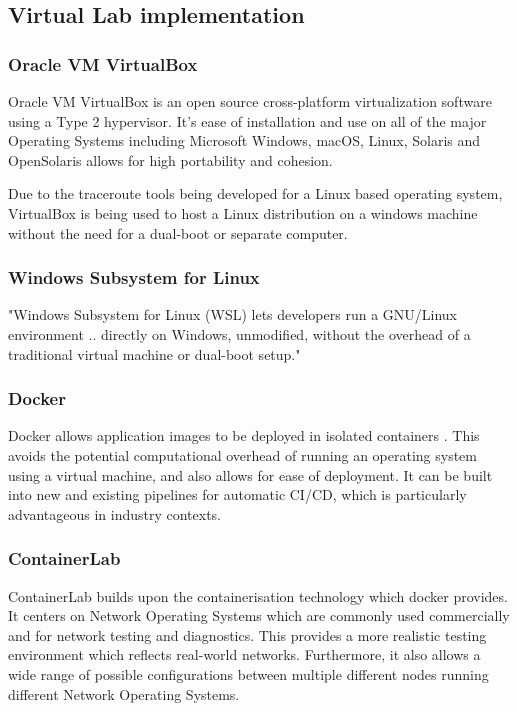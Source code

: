 \subsection{Virtual Lab implementation}

\subsubsection{Oracle VM VirtualBox}
Oracle VM VirtualBox is an open source cross-platform virtualization software using a Type 2 hypervisor. \cite{VirtualWare} It's ease of installation and use on all of the major Operating Systems including Microsoft Windows, macOS, Linux, Solaris and OpenSolaris \cite{oracleVM} allows for high portability and cohesion. 

Due to the traceroute tools being developed for a Linux based operating system, VirtualBox is being used to host a Linux distribution on a windows machine without the need for a dual-boot or separate computer.

\subsubsection{Windows Subsystem for Linux}
"Windows Subsystem for Linux (WSL) lets developers run a GNU/Linux environment .. directly on Windows, unmodified, without the overhead of a traditional virtual machine or dual-boot setup." \cite{wsl}

\subsubsection{Docker}
Docker allows application images to be deployed in isolated containers \cite{docker_isolate}. This avoids the potential computational overhead of running an operating system using a virtual machine, and also allows for ease of deployment. It can be built into new and existing pipelines for automatic CI/CD, which is particularly advantageous in industry contexts. 

\subsubsection{ContainerLab}

ContainerLab builds upon the containerisation technology which docker provides. It centers on Network Operating Systems which are commonly used commercially and for network testing and diagnostics. This provides a more realistic testing environment which reflects real-world networks. Furthermore, it also allows a wide range of possible configurations between multiple different nodes running different Network Operating Systems.

